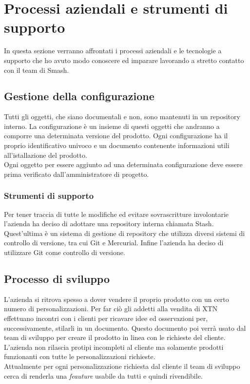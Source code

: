 \section{Processi aziendali e strumenti di supporto}
In questa sezione verranno affrontati i processi aziendali e le tecnologie a supporto che ho avuto modo conoscere ed imparare lavorando a stretto contatto con il team di Smash\textregistered.

\subsection{Gestione della configurazione}
Tutti gli oggetti, che siano documentali e non, sono mantenuti in un repository interno. La configurazione è un insieme di questi oggetti che andranno a comporre una determinata versione del prodotto. Ogni configurazione ha il proprio identificativo univoco e un documento contenente informazioni utili all'istallazione del prodotto.\\
Ogni oggetto per essere aggiunto ad una determinata configurazione deve essere prima verificato dall'amministratore di progetto.
\subsubsection{Strumenti di supporto}
Per tener traccia di tutte le modifiche ed evitare sovrascritture involontarie l'azienda ha deciso di adottare una repository interna chiamata Stash. Quest'ultima è un sistema di gestione di repository che utilizza diversi sistemi di controllo di versione, tra cui Git e Mercurial. Infine l'azienda ha deciso di utilizzare Git come controllo di versione.
\subsection{Processo di sviluppo}
L'azienda si ritrova spesso a dover vendere il proprio prodotto con un certo numero di personalizzazioni. Per far ciò gli addetti alla vendita di XTN effettuano incontri con i clienti per ricavare idee ed osservazioni per, successivamente, stilarli in un documento. Questo documento poi verrà usato dal team di sviluppo per creare il prodotto in linea con le richieste del cliente.\\
L'azienda non rilascia protipi incompleti al cliente ma solamente prodotti funzionanti con tutte le personalizzazioni richieste.\\
Attualmente per ogni personalizzazione richiesta dal cliente il team di sviluppo cerca di renderla una \textit{feauture} usabile da tutti e quindi rivendibile.
